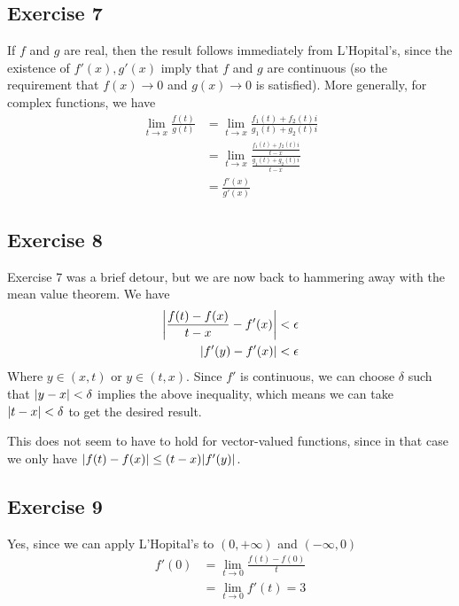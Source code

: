 \subsection{Exercise 7}
If $f$ and $g$ are real, then the result follows immediately from L'Hopital's, since the existence of 
$f'(x), g'(x)$ imply that $f$ and $g$ are continuous (so the requirement that $f(x) \to 0$ and $g(x) \to 0$ 
is satisfied). More generally, for complex functions, we have
\begin{align*}
        \lim_{t \to x} \frac{f(t)}{g(t)} &= \lim_{t \to x} \frac{f_1(t) + f_2(t) i}{g_1(t) + g_2(t) i} \\
                                         &= \lim_{t \to x} \frac{\frac{f_1(t) + f_2(t)i}{t - x}}{\frac{g_1(t) + g_2(t)i}{t - x}} \\
                                         &= \frac{f'(x)}{g'(x)}
\end{align*}

\subsection{Exercise 8}
Exercise 7 was a brief detour, but we are now back to hammering away with the mean value theorem. We have
\begin{align*}
        \abs{\frac{f(t) - f(x)}{t - x} - f'(x)} &< \epsilon \\
        \abs{f'(y) - f'(x)} &< \epsilon 
\end{align*}
Where $y \in (x, t)$ or $y \in (t, x)$. Since $f'$ is continuous, we can choose $\delta$ such that
$\abs{y - x} < \delta$ implies the above inequality, which means we can take $\abs{t - x} < \delta$ to
get the desired result.

This does not seem to have to hold for vector-valued functions, since in that case we only have
$\abs{f(t) - f(x)} \leq (t - x) \abs{f'(y)}$.

\subsection{Exercise 9}
Yes, since we can apply L'Hopital's to $(0, +\infty)$ and $(-\infty, 0)$
\begin{align*}
        f'(0) &= \lim_{t \to 0} \frac{f(t) - f(0)}{t} \\
              &= \lim_{t \to 0} f'(t) = 3
\end{align*}

